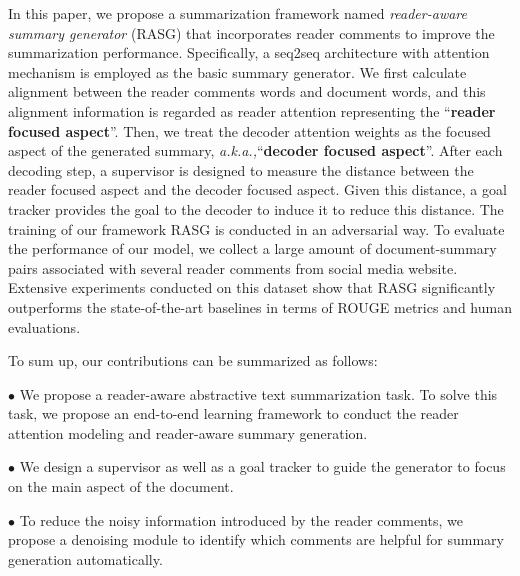 \documentclass[letterpaper]{article} %
\newcommand{\aka}{\emph{a.k.a.,}\xspace}
\begin{document}
In this paper, we propose a summarization framework named \emph{reader-aware summary generator} (RASG) that incorporates reader comments to improve the summarization performance.
Specifically, a seq2seq architecture with attention mechanism is employed as the basic summary generator.
We first calculate alignment between the reader comments words and document words, and this alignment information is regarded as reader attention representing the ``\textbf{reader focused aspect}''.
Then, we treat the decoder attention weights as the focused aspect of the generated summary, \aka ``\textbf{decoder focused aspect}''.
After each decoding step, a supervisor is designed to measure the distance between the reader focused aspect and the decoder focused aspect.
Given this distance, a goal tracker provides the goal to the decoder to induce it to reduce this distance.
The training of our framework RASG is conducted in an adversarial way.
To evaluate the performance of our model, we collect a large amount of document-summary pairs associated with several reader comments from social media website. 
Extensive experiments conducted on this dataset show that RASG significantly outperforms the state-of-the-art baselines in terms of ROUGE metrics and human evaluations.
 
To sum up, our contributions can be summarized as follows: 

$\bullet$ We propose a reader-aware abstractive text summarization task. To solve this task, we propose an end-to-end learning framework to conduct the reader attention modeling and reader-aware summary generation.

$\bullet$ %
We design a supervisor as well as a goal tracker to guide the generator to focus on the main aspect of the document.

$\bullet$ To reduce the noisy information introduced by the reader comments, we propose a denoising module to identify which comments are helpful for summary generation automatically.
\end{document}
